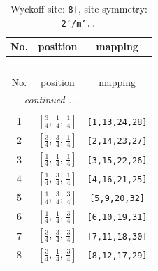 \documentclass[fleqn,8pt]{jsarticle}
\begin{document}
\begin{longtable}{ccc}
\caption{Wyckoff site: {\tt 8f}, site symmetry: {\tt 2'/m'..}}
 \\
 \hline \hline
No. & position & mapping \\ \hline \endfirsthead

\multicolumn{2}{l}{\tablename\ \thetable{}} \\
 \hline \hline
No. & position & mapping \\ \hline \endhead

 \hline \hline
\multicolumn{2}{r}{\footnotesize\it continued ...} \\ \endfoot

 \hline \hline
\multicolumn{2}{r}{} \\ \endlastfoot

1 & $\left[ \frac{3}{4},\, \frac{1}{4},\, \frac{1}{4} \right]$ & {\tt [1,13,24,28]} \\ \hline
2 & $\left[ \frac{3}{4},\, \frac{3}{4},\, \frac{1}{4} \right]$ & {\tt [2,14,23,27]} \\ \hline
3 & $\left[ \frac{1}{4},\, \frac{1}{4},\, \frac{1}{4} \right]$ & {\tt [3,15,22,26]} \\ \hline
4 & $\left[ \frac{1}{4},\, \frac{3}{4},\, \frac{1}{4} \right]$ & {\tt [4,16,21,25]} \\ \hline
5 & $\left[ \frac{1}{4},\, \frac{3}{4},\, \frac{3}{4} \right]$ & {\tt [5,9,20,32]} \\ \hline
6 & $\left[ \frac{1}{4},\, \frac{1}{4},\, \frac{3}{4} \right]$ & {\tt [6,10,19,31]} \\ \hline
7 & $\left[ \frac{3}{4},\, \frac{3}{4},\, \frac{3}{4} \right]$ & {\tt [7,11,18,30]} \\ \hline
8 & $\left[ \frac{3}{4},\, \frac{1}{4},\, \frac{3}{4} \right]$ & {\tt [8,12,17,29]} \\
\end{longtable}
\renewcommand{\arraystretch}{1.2}
\end{document}
